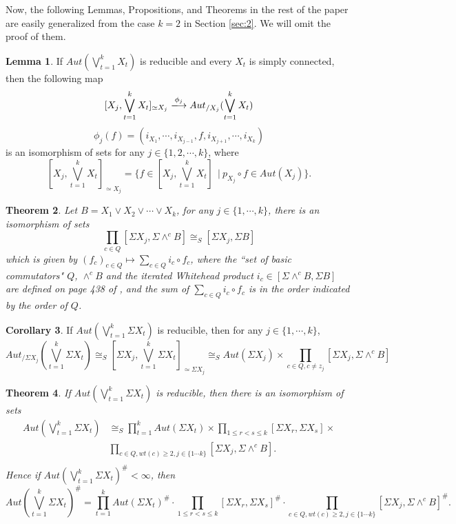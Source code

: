 \documentclass[12pt]{article}
\theoremstyle{theorem}
\newtheorem{theorem}{Theorem}[section]
\theoremstyle{definition}
\theoremstyle{proposition}
\theoremstyle{corollary}
\newtheorem{corollary}[theorem]{Corollary}
\theoremstyle{lemma}
\newtheorem{lemma}[theorem]{Lemma}
\theoremstyle{remark}
\theoremstyle{example}
\begin{document}
{Now, the following  Lemmas, Propositions, and Theorems in the rest of the paper are easily generalized from the case $k=2$ in Section \ref{sec:2}. We will omit the proof of them.

 \begin{lemma}\label{lemma 3.8}
  If $Aut(\bigvee\limits_{t=1}^{k}X_{t})$ is reducible and every $X_{t}$ is simply connected, then the following map
  $$[X_{j},\bigvee\limits_{t=1}^{k}X_{t}]_{\simeq X_{j}} \xlongrightarrow{\phi_{j}}{\ensuremath{Aut_{/X_{{j}}}(\bigvee\limits_{t=1}^{k}X_{t})}}$$
  $$\phi_{j}(f)=(i_{X_{1}},\cdots, i_{X_{j-1}},f, i_{X_{j+1}},\cdots,i_{X_{k}} )$$
  is an isomorphism of sets for any $j\in\{1,2,\cdots,k\}$, where $$[X_{j},\bigvee\limits_{t=1}^{k}X_{t}]_{\simeq X_{j}}=\{f\in [X_{j},\bigvee\limits_{t=1}^{k}X_{t}]~~|~p_{X_{j}}{\ensuremath{{\scriptstyle\circ}}} f\in Aut(X_{j})\}.$$
  \end{lemma}

\begin{theorem}\label{theorem 3.9}
 Let $B=X_{1}\vee X_2\vee\cdots \vee X_{k}$, for any $j\in\{1,\cdots,k\}$, there is an isomorphism of sets
  $$\prod\limits_{c\in Q}[\Sigma X_{j}, \Sigma \wedge^{c}B]\cong_{S}[\Sigma X_{j}, \Sigma B] $$
  which is given by $(f_{c})_{c\in Q}\mapsto \sum\limits_{c\in Q}i_{c}{\ensuremath{{\scriptstyle\circ}}} f_{c}$, where the ``set of basic commutators" $Q$,  $\wedge^{c}B$ and the iterated Whitehead product $i_{c}\in [\Sigma \wedge^{c}B, \Sigma B]$ are defined on page 438 of \cite{BaHH}, and the sum of $\sum\limits_{c\in Q}i_{c}{\ensuremath{{\scriptstyle\circ}}} f_{c}$ is in the order indicated by the order of $Q$.
 \end{theorem}

\begin{corollary}\label{corollary3.10}
If $Aut(\bigvee\limits_{t=1}^{k}\Sigma X_{t})$ is reducible, then for any $j\in\{1,\cdots,k\}$,
$$Aut_{/\Sigma X_{j}}(\bigvee\limits_{t=1}^{k}\Sigma X_{t})\cong_{S}[\Sigma X_{j},\bigvee\limits_{t=1}^{k}\Sigma X_{t}]_{\simeq \Sigma X_{j}}\cong_{S}Aut(\Sigma X_{j})\times\prod\limits_{c\in Q, c\neq z_{j}}[\Sigma X_j, \Sigma \wedge^{c}B]$$
\end{corollary}

\begin{theorem}\label{theorem 3.11}
 If $Aut(\bigvee\limits_{t=1}^{k}\Sigma X_{t})$ is reducible, then there is an isomorphism of sets
 $$
     \begin{array}{rl}
        Aut(\bigvee\limits_{t=1}^{k}\Sigma X_{t}) &\cong_{S}\prod\limits_{t=1}^{k}Aut(\Sigma X_{t})\times \prod\limits_{1\leq r<s\leq k}[\Sigma X_{r},\Sigma X_{s}]\times \\
        & \prod\limits_{c\in Q, wt(c)\geq 2, j\in\{1\cdots k\}}[\Sigma X_{j},\Sigma \wedge^{c}B]. \\
      \end{array}
     $$
   Hence  if $Aut(\bigvee\limits_{t=1}^{k}\Sigma X_{t})^{\#}<\infty$, then
$$  Aut(\bigvee\limits_{t=1}^{k}\Sigma X_{t})^{\#}=\prod\limits_{t=1}^{k}Aut(\Sigma X_{t})^{\#}\cdot \prod\limits_{1\leq r<s\leq k}[\Sigma X_{r},\Sigma X_{s}]^{\#}\cdot\prod\limits_{c\in Q, wt(c)\geq 2, j\in\{1\cdots k\}}[\Sigma X_{j},\Sigma \wedge^{c}B]^{\#}  .$$
  \end{theorem}

}
\end{document}
